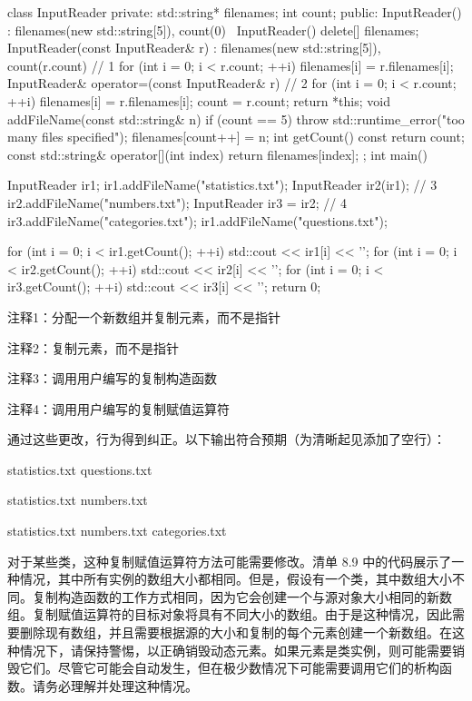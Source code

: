 \begin{cpp}
class InputReader {
private:
  std::string* filenames;
  int count;
public:
  InputReader() : filenames(new std::string[5]), count(0) {}
  ~InputReader() { delete[] filenames; }
  InputReader(const InputReader& r) : filenames(new std::string[5]),
      count(r.count) { // 1
    for (int i = 0; i < r.count; ++i)
      filenames[i] = r.filenames[i];
  }
  InputReader& operator=(const InputReader& r) { // 2
    for (int i = 0; i < r.count; ++i)
      filenames[i] = r.filenames[i];
    count = r.count;
    return *this;
  }
  void addFileName(const std::string& n) {
    if (count == 5)
      throw std::runtime_error("too many files specified");
    filenames[count++] = n;
  }
  int getCount() const { return count; }
  const std::string& operator[](int index) {
  return filenames[index];
}
};
int main() {
  InputReader ir1;
  ir1.addFileName("statistics.txt");
  InputReader ir2(ir1); // 3
  ir2.addFileName("numbers.txt");
  InputReader ir3 = ir2; // 4
  ir3.addFileName("categories.txt");
  ir1.addFileName("questions.txt");

  for (int i = 0; i < ir1.getCount(); ++i)
    std::cout << ir1[i] << '\n';
  for (int i = 0; i < ir2.getCount(); ++i)
    std::cout << ir2[i] << '\n';
  for (int i = 0; i < ir3.getCount(); ++i)
    std::cout << ir3[i] << '\n';
  return 0;
}
\end{cpp}

{\footnotesize
注释1：分配一个新数组并复制元素，而不是指针

注释2：复制元素，而不是指针

注释3：调用用户编写的复制构造函数

注释4：调用用户编写的复制赋值运算符
}

通过这些更改，行为得到纠正。以下输出符合预期（为清晰起见添加了空行）：

\begin{shell}
statistics.txt
questions.txt

statistics.txt
numbers.txt

statistics.txt
numbers.txt
categories.txt
\end{shell}

对于某些类，这种复制赋值运算符方法可能需要修改。清单 8.9 中的代码展示了一种情况，其中所有实例的数组大小都相同。但是，假设有一个类，其中数组大小不 同。复制构造函数的工作方式相同，因为它会创建一个与源对象大小相同的新数组。复制赋值运算符的目标对象将具有不同大小的数组。由于是这种情况，因此需要删除现有数组，并且需要根据源的大小和复制的每个元素创建一个新数组。在这种情况下，请保持警惕，以正确销毁动态元素。如果元素是类实例，则可能需要销毁它们。尽管它可能会自动发生，但在极少数情况下可能需要调用它们的析构函数。请务必理解并处理这种情况。

